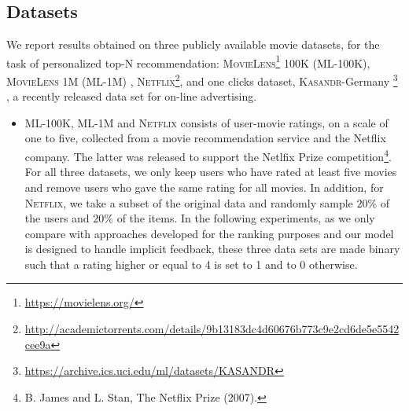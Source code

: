 \documentclass[10pt,journal,compsoc]{IEEEtran}
\newcommand{\MovieL}{\textsc{MovieLens}}
\newcommand{\NetF}{\textsc{Netflix}}
\newcommand{\RecS}{\textsc{RecSys 2016}}
\newcommand{\Out}{\textsc{Outbrain}}
\newcommand{\ML}{\textsc{ML}}
\newcommand{\kasandr}{\textsc{Kasandr}}
\newcommand{\cmmnt}[1]{}
\begin{document}
\begin{sloppypar}
\subsection{Datasets}
\label{sec:Data}
We report results obtained on three publicly available movie data\-sets, for the
task of personalized top-N recommendation: {\MovieL}\footnote{\url{https://movielens.org/}} 100K (\ML-100K), {\MovieL} 1M (\ML-1M) \cite{Harper:2015:MDH:2866565.2827872}, {\NetF}\footnote{\url{http://academictorrents.com/details/9b13183dc4d60676b773c9e2cd6de5e5542cee9a}}, and one clicks dataset, {\kasandr}-Germany \footnote{\url{https://archive.ics.uci.edu/ml/datasets/KASANDR}} \cite{DBLP:conf/sigir/sidana17}, a recently released data set for on-line advertising.
\begin{itemize}
\item \ML-100K, \ML-1M and {\NetF} consists of user-movie ratings, on a scale of one to five, collected from a movie recommendation service and the Netflix company. The latter was released to support the Netlfix Prize competition\footnote{B. James and L. Stan, The Netflix Prize (2007).}. \cmmnt{\ML-100K dataset gathers 100,000 ratings from 943 users on 1682 movies, \ML-1M dataset comprises of 1,000,000 ratings from 6040 users and 3900 movies and {\NetF} consists of 100 million ratings from 480,000 users and 17,000 movies.} For all three datasets, we only keep users who have rated at least five movies and remove users who gave the same rating for all movies. In addition, for {\NetF}, we take a subset of the original data and randomly sample $20\%$ of the users and $20\%$ of the items. In the following experiments, as we only compare with approaches developed for the ranking purposes and our model is designed to handle implicit feedback, these three data sets are made binary such that a rating higher or equal to 4 is set to 1 and to 0 otherwise.



\end{itemize}
\end{sloppypar}
\end{document}

